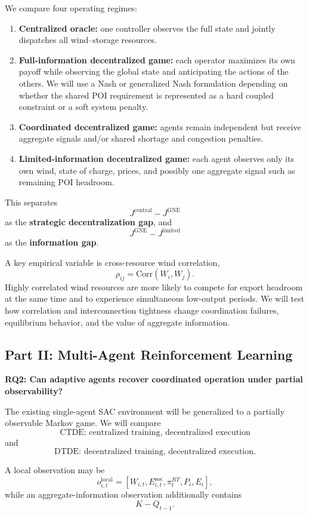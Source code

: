 \documentclass[10pt]{article}
\begin{document}
We compare four operating regimes:

\begin{enumerate}
    \item \textbf{Centralized oracle:} one controller observes the full state and jointly dispatches all wind--storage resources.
    \item \textbf{Full-information decentralized game:} each operator maximizes its own payoff while observing the global state and anticipating the actions of the others. We will use a Nash or generalized Nash formulation depending on whether the shared POI requirement is represented as a hard coupled constraint or a soft system penalty.
    \item \textbf{Coordinated decentralized game:} agents remain independent but receive aggregate signals and/or shared shortage and congestion penalties.
    \item \textbf{Limited-information decentralized game:} each agent observes only its own wind, state of charge, prices, and possibly one aggregate signal such as remaining POI headroom.
\end{enumerate}

This separates
\[
J^{\mathrm{central}}-J^{\mathrm{GNE}}
\]
as the \textbf{strategic decentralization gap}, and
\[
J^{\mathrm{GNE}}-J^{\mathrm{limited}}
\]
as the \textbf{information gap}.

A key empirical variable is cross-resource wind correlation,
\[
\rho_{ij}=\mathrm{Corr}(W_i,W_j).
\]
Highly correlated wind resources are more likely to compete for export headroom at the same time and to experience simultaneous low-output periods. We will test how correlation and interconnection tightness change coordination failures, equilibrium behavior, and the value of aggregate information.

\subsection*{Part II: Multi-Agent Reinforcement Learning}

\textbf{RQ2: Can adaptive agents recover coordinated operation under partial observability?}

The existing single-agent SAC environment will be generalized to a partially observable Markov game. We will compare
\[
\text{CTDE: centralized training, decentralized execution}
\]
and
\[
\text{DTDE: decentralized training, decentralized execution}.
\]

A local observation may be
\[
o_{i,t}^{\mathrm{local}}
=
\left[
W_{i,t},
E^{\mathrm{soc}}_{i,t},
\pi_t^{RT},
P_i,
E_i
\right],
\]
while an aggregate-information observation additionally contains
\[
K-Q_{t-1}.
\]
\end{document}
